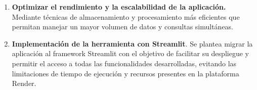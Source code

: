 \begin{enumerate}
    \item \textbf{Optimizar el rendimiento y la escalabilidad de la aplicación.} Mediante técnicas de almacenamiento y procesamiento más eficientes que permitan manejar un mayor volumen de datos y consultas simultáneas.
    \item \textbf{Implementación de la herramienta con Streamlit}. Se plantea migrar la aplicación al framework Streamlit con el objetivo de facilitar su despliegue y permitir el acceso a todas las funcionalidades desarrolladas, evitando las limitaciones de tiempo de ejecución y recursos presentes en la plataforma Render.
\end{enumerate}
